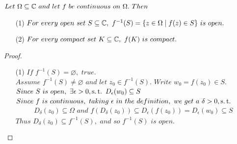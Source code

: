 	\vspace*{2em}
	\begin{proposition}\label{prop 2.1.1}
		$Let \,\, \Omega \subseteq \mathbb{C} \,\, and \,\, let \,\, f \,\, be \,\, continuous \,\, on \,\, \Omega . \,\, Then$
		\begin{enumerate}
			\item[(1)]$For \,\, every \,\, open \,\, set \,\, S \subseteq \mathbb{C} , \,\, f^{-1}(S) = \{ z \in \Omega \mid f(z) \in S \} \,\, is \,\, open.$
			
			\item[(2)]$For \,\, every \,\, compact \,\, set \,\, K \subseteq \mathbb{C} , \,\, f(K) \,\, is \,\, compact.$
		\end{enumerate}
	
		\vspace*{2em}
		\begin{proof}
			\begin{enumerate}
				\item[(1)]$If \,\, f^{-1}(S) = \varnothing , \,\, true.$\\
				$Assume \,\, f^{-1}(S) \neq \varnothing \,\, and \,\, let \,\, z_0 \in f^{-1}(S) . \,\, Write \,\, w_0 = f(z_0) \in S.$\\
				$Since \,\, S \,\, is \,\, open , \,\, \exists \epsilon > 0 , \operatorname{s.t.} \,\, D_{\epsilon}(w_0) \subseteq S$\\
				$Since \,\, f \,\, is \,\, continuous , \,\, taking \,\, \epsilon \,\, in \,\, the \,\, definition , \,\, we \,\, get \,\, a \,\, \delta > 0 , \operatorname{s.t.}$
				\begin{align}
					D_{\delta}(z_0) \subseteq \Omega \,\, and \,\, f(D_{\delta}(z_0)) \subseteq D_{\epsilon}(f(z_0)) = D_{\epsilon}(w_0) \subseteq S
				\end{align}
				$Thus \,\, D_{\delta}(z_0) \subseteq f^{-1}(S) , \,\, and \,\, so \,\, f^{-1}(S) \,\, is \,\, open.$
				
				\vspace*{2em}
				

\end{enumerate}
\end{proof}
\end{proposition}
